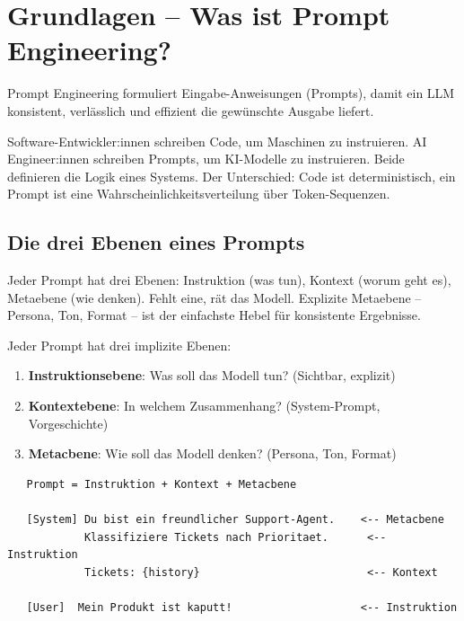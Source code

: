 \section{Grundlagen -- Was ist Prompt Engineering?}

Prompt Engineering formuliert Eingabe-Anweisungen (Prompts), damit ein LLM konsistent, verlässlich und effizient die gewünschte Ausgabe liefert.

Software-Entwickler:innen schreiben Code, um Maschinen zu instruieren. AI Engineer:innen schreiben Prompts, um KI-Modelle zu instruieren. Beide definieren die Logik eines Systems. Der Unterschied: Code ist deterministisch, ein Prompt ist eine Wahrscheinlichkeitsverteilung über Token-Sequenzen.

\subsection{Die drei Ebenen eines Prompts}

\begin{praxishinweis}
Jeder Prompt hat drei Ebenen: Instruktion (was tun), Kontext (worum geht es), Metaebene (wie denken). Fehlt eine, rät das Modell. Explizite Metaebene -- Persona, Ton, Format -- ist der einfachste Hebel für konsistente Ergebnisse.
\end{praxishinweis}

Jeder Prompt hat drei implizite Ebenen:

\begin{enumerate}[leftmargin=*]
    \item \textbf{Instruktionsebene}: Was soll das Modell tun? (Sichtbar, explizit)
    \item \textbf{Kontextebene}: In welchem Zusammenhang? (System-Prompt, Vorgeschichte)
    \item \textbf{Metacbene}: Wie soll das Modell denken? (Persona, Ton, Format)
\end{enumerate}

\begin{verbatim}
   Prompt = Instruktion + Kontext + Metacbene
   
   [System] Du bist ein freundlicher Support-Agent.    <-- Metacbene
            Klassifiziere Tickets nach Prioritaet.      <-- Instruktion
            Tickets: {history}                          <-- Kontext
   
   [User]  Mein Produkt ist kaputt!                    <-- Instruktion
\end{verbatim}

